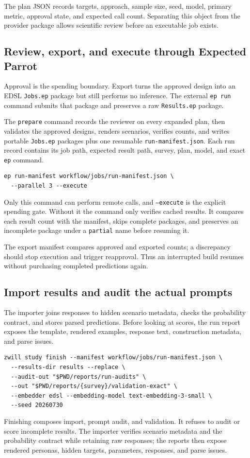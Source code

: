 \documentclass[11pt]{article}
\begin{document}
The plan JSON records targets, approach, sample size, seed, model, primary
metric, approval state, and expected call count. Separating this object from
the provider package allows scientific review before an executable job exists.

\subsection{Review, export, and execute through Expected Parrot}
Approval is the spending boundary. Export turns the approved design into an
EDSL \texttt{Jobs.ep} package but still performs no inference. The external
\texttt{ep run} command submits that package and preserves a raw
\texttt{Results.ep} package.

The \texttt{prepare} command records the reviewer on every expanded plan, then
validates the approved designs, renders scenarios, verifies counts, and writes
portable \texttt{Jobs.ep} packages plus one resumable
\texttt{run-manifest.json}. Each run record contains its job path, expected
result path, survey, plan, model, and exact \texttt{ep} command.

\begin{lstlisting}[style=shell]
ep run-manifest workflow/jobs/run-manifest.json \
  --parallel 3 --execute
\end{lstlisting}
Only this command can perform remote calls, and \texttt{--execute} is the explicit
spending gate. Without it the command only verifies cached results. It compares
each result count with the manifest, skips complete packages, and preserves an
incomplete package under a \texttt{partial} name before resuming it.

The export manifest compares approved and exported counts; a discrepancy
should stop execution and trigger reapproval. Thus an interrupted build resumes
without purchasing completed predictions again.

\subsection{Import results and audit the actual prompts}
The importer joins responses to hidden scenario metadata, checks the
probability contract, and stores parsed predictions. Before looking at scores,
the run report exposes the template, rendered examples, response text,
construction metadata, and parse issues.

\begin{lstlisting}[style=shell]
zwill study finish --manifest workflow/jobs/run-manifest.json \
  --results-dir results --replace \
  --audit-out "$PWD/reports/run-audits" \
  --out "$PWD/reports/{survey}/validation-exact" \
  --embedder edsl --embedding-model text-embedding-3-small \
  --seed 20260730
\end{lstlisting}
Finishing composes import, prompt audit, and validation. It refuses to audit or
score incomplete results. The importer verifies scenario metadata and the
probability contract while retaining raw responses; the reports then expose
rendered personas, hidden targets, parameters, responses, and parse issues.
\end{document}
